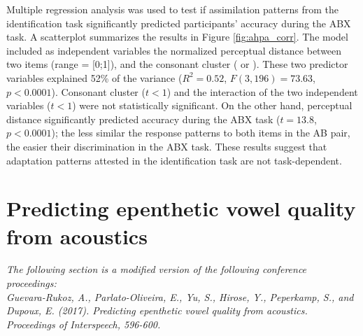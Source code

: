 {Multiple regression analysis was used to test if assimilation patterns from the identification task significantly predicted participants' accuracy during the ABX task. A scatterplot summarizes the results in Figure \ref{fig:ahpa_corr}. The model included as independent variables the normalized perceptual distance between two items (range = [0;1]), and the consonant cluster ( or ). These two predictor variables explained 52\% of the variance ($R^{2} = 0.52$, $F(3,196) = 73.63$, $p < 0.0001$). Consonant cluster ($t < 1$) and the interaction of the two independent variables ($t < 1$) were not statistically significant. On the other hand, perceptual distance significantly predicted accuracy during the ABX task ($t = 13.8$, $p < 0.0001$); the less similar the response patterns to both items in the AB pair, the easier their discrimination in the ABX task. These results suggest that adaptation patterns attested in the identification task are not task-dependent.}



% 

\newpage
\section{Predicting epenthetic vowel quality from acoustics}


\textit{{\color{blue}The following section is a modified version of the following conference proceedings: \\
Guevara-Rukoz, A., Parlato-Oliveira, E., Yu, S., Hirose, Y., Peperkamp, S., and Dupoux, E. (2017). Predicting epenthetic vowel quality from acoustics. Proceedings of Interspeech, 596-600.}}

